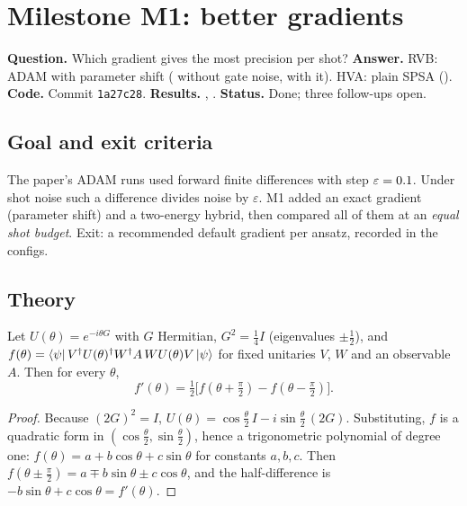 \section{Milestone M1: better gradients}
\label{sec:m1}

\begin{tcolorbox}[colback=gray!5, colframe=gray!40, title={M1 at a glance}, fonttitle=\bfseries]
  \textbf{Question.} Which gradient gives the most precision per shot?\quad
  \textbf{Answer.} RVB: ADAM with parameter shift (\VMIdealRvbPs{} without gate noise,
  \VMNoisyRvbPs{} with it). HVA: plain SPSA (\VMIdealHvaSpsa).\\
  \textbf{Code.} Commit \texttt{1a27c28}. \textbf{Results.} ,
  . \textbf{Status.} Done; three follow-ups open.
\end{tcolorbox}

\subsection{Goal and exit criteria}

The paper's ADAM runs used forward finite differences with step $\varepsilon=0.1$. Under
shot noise such a difference divides noise by $\varepsilon$. M1 added an exact gradient
(parameter shift) and a two-energy hybrid, then compared all of them at an \emph{equal shot
budget}. Exit: a recommended default gradient per ansatz, recorded in the configs.

\subsection{Theory}

\begin{thm}\label{thm:ps}
  Let $U(\theta)=e^{-i\theta G}$ with $G$ Hermitian, $G^2=\tfrac14 I$ (eigenvalues
  $\pm\tfrac12$), and $f(\theta)=\bra{\psi}V^\dagger U(\theta)^\dagger W^\dagger A\,W U(\theta)V\ket\psi$
  for fixed unitaries $V$, $W$ and an observable $A$. Then for every $\theta$,
  \[
    f'(\theta)=\tfrac12\bigl[f(\theta+\tfrac\pi2)-f(\theta-\tfrac\pi2)\bigr].
  \]
\end{thm}

\begin{proof}
  Because $(2G)^2=I$, $U(\theta)=\cos\tfrac\theta2\,I-i\sin\tfrac\theta2\,(2G)$. Substituting,
  $f$ is a quadratic form in $(\cos\frac\theta2,\sin\frac\theta2)$, hence a trigonometric
  polynomial of degree one: $f(\theta)=a+b\cos\theta+c\sin\theta$ for constants $a,b,c$. Then
  $f(\theta\pm\tfrac\pi2)=a\mp b\sin\theta\pm c\cos\theta$, and the half-difference is
  $-b\sin\theta+c\cos\theta=f'(\theta)$.
\end{proof}

